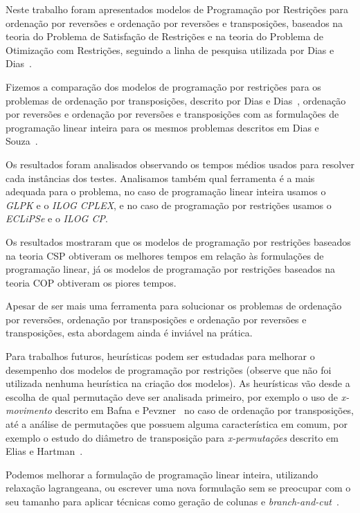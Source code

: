 Neste trabalho foram apresentados modelos de Programação por
Restrições para ordenação por reversões e ordenação por reversões e
transposições, baseados na teoria do Problema de Satisfação de
Restrições e na teoria do Problema de Otimização com Restrições,
seguindo a linha de pesquisa utilizada por Dias e
Dias~\cite{DiasDias*2009}.

Fizemos a comparação dos modelos de programação por restrições para os
problemas de ordenação por transposições, descrito por Dias e
Dias~\cite{DiasDias*2009}, ordenação por reversões e ordenação por
reversões e transposições com as formulações de programação linear
inteira para os mesmos problemas descritos em Dias e
Souza~\cite{DiasSouza*2007}.

Os resultados foram analisados observando os tempos médios usados para
resolver cada instâncias dos testes. Analisamos também qual ferramenta
é a mais adequada para o problema, no caso de programação linear
inteira usamos o \textit{GLPK} e o \textit{ILOG CPLEX}, e no caso de
programação por restrições usamos o \textit{ECLiPSe} e o \textit{ILOG
CP}.

Os resultados mostraram que os modelos de programação por restrições
baseados na teoria CSP obtiveram os melhores tempos em relação às
formulações de programação linear, já os modelos de programação por
restrições baseados na teoria COP obtiveram os piores tempos.

Apesar de ser mais uma ferramenta para solucionar os problemas de
ordenação por reversões, ordenação por transposições e ordenação por
reversões e transposições, esta abordagem ainda é inviável na
prática.

Para trabalhos futuros, heurísticas podem ser estudadas para melhorar
o desempenho dos modelos de programação por restrições (observe que
não foi utilizada nenhuma heurística na criação dos modelos). As
heurísticas vão desde a escolha de qual permutação deve ser analisada
primeiro, por exemplo o uso de \textit{x-movimento} descrito em Bafna
e Pevzner~\cite{BafnaPevzner*1998} no caso de ordenação por
transposições, até a análise de permutações que possuem alguma
característica em comum, por exemplo o estudo do diâmetro de
transposição para \textit{x-permutações} descrito em Elias e
Hartman~\cite{EliasHartman*2006}.

Podemos melhorar a formulação de programação linear inteira,
utilizando relaxação lagrangeana, ou escrever uma nova formulação sem
se preocupar com o seu tamanho para aplicar técnicas como geração de
colunas
e \textit{branch-and-cut}~\cite{NemhauserWolsey*1988,Wolsey*1998}.
